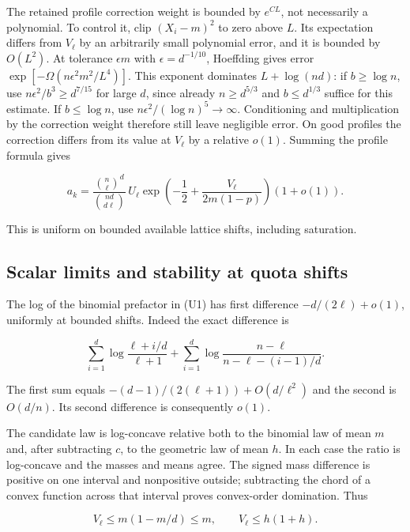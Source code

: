 The retained profile correction weight is bounded by $e^{CL}$, not necessarily a polynomial. To control it, clip $(X_i-m)^2$ to zero above $L$. Its expectation differs from $V_\ell$ by an arbitrarily small polynomial error, and it is bounded by $O(L^2)$. At tolerance $\epsilon m$ with $\epsilon=d^{-1/10}$, Hoeffding gives error $\exp[-\Omega(n\epsilon^2 m^2/L^4)]$. This exponent dominates $L+\log(nd)$: if $b\ge\log n$, use $n\epsilon^2/b^3\ge d^{7/15}$ for large $d$, since already $n\ge d^{5/3}$ and $b\le d^{1/3}$ suffice for this estimate. If $b\le\log n$, use $n\epsilon^2/(\log n)^5\to\infty$. Conditioning and multiplication by the correction weight therefore still leave negligible error. On good profiles the correction differs from its value at $V_\ell$ by a relative $o(1)$. Summing the profile formula gives

\begin{equation}
a_k=\frac{\binom n\ell^d}{\binom{nd}{d\ell}}\,
U_\ell\exp\left(-\frac12+\frac{V_\ell}{2m(1-p)}\right)(1+o(1)).
\tag{U1}
\end{equation}

This is uniform on bounded available lattice shifts, including saturation.

\subsection{Scalar limits and stability at quota shifts}

The log of the binomial prefactor in (U1) has first difference $-d/(2\ell)+o(1)$, uniformly at bounded shifts. Indeed the exact difference is

\begin{equation*}
\sum_{i=1}^d\log\frac{\ell+i/d}{\ell+1}
+\sum_{i=1}^d\log\frac{n-\ell}{n-\ell-(i-1)/d}.
\end{equation*}

The first sum equals $-(d-1)/(2(\ell+1))+O(d/\ell^2)$ and the second is $O(d/n)$. Its second difference is consequently $o(1)$.

The candidate law is log-concave relative both to the binomial law of mean $m$ and, after subtracting $c$, to the geometric law of mean $h$. In each case the ratio is log-concave and the masses and means agree. The signed mass difference is positive on one interval and nonpositive outside; subtracting the chord of a convex function across that interval proves convex-order domination. Thus

\begin{equation}
V_\ell\le m(1-m/d)\le m,\qquad V_\ell\le h(1+h).
\tag{U2}
\end{equation}

